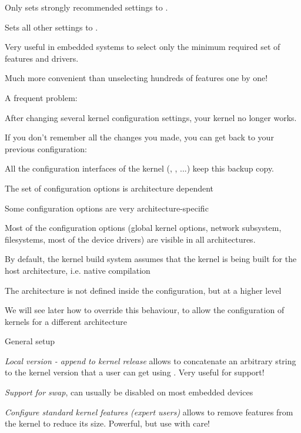   \startitemize
  \item Only sets strongly recommended settings to .
  \item Sets all other settings to .
  \item Very useful in embedded systems to select only the minimum
    required set of features and drivers.
  \item Much more convenient than unselecting hundreds of features one
    by one!
  \stopitemize

  A frequent problem:
  \startitemize
  \item After changing several kernel configuration settings, your
    kernel no longer works.
  \item If you don't remember all the changes you made,
    you can get back to your previous configuration:\\
  \item All the configuration interfaces of the kernel
    (, , ...) keep
    this  backup copy.
  \stopitemize

  \startitemize
  \item The set of configuration options is architecture dependent
    \startitemize
    \item Some configuration options are very architecture-specific
    \item Most of the configuration options (global kernel options,
      network subsystem, filesystems, most of the device drivers) are
      visible in all architectures.
    \stopitemize
  \item By default, the kernel build system assumes that the kernel is
    being built for the host architecture, i.e. native compilation
  \item The architecture is not defined inside the configuration, but
    at a higher level
  \item We will see later how to override this behaviour, to allow the
    configuration of kernels for a different architecture
  \stopitemize

  \startitemize
  \item General setup
    \startitemize
    \item {\em Local version - append to kernel release} allows to
      concatenate an arbitrary string to the kernel version that a
      user can get using . Very useful for support!
    \item {\em Support for swap}, can usually be disabled on most
      embedded devices
    \item {\em Configure standard kernel features (expert users)}
      allows to remove features from the kernel to reduce its
      size. Powerful, but use with care!
    \stopitemize
  \stopitemize

